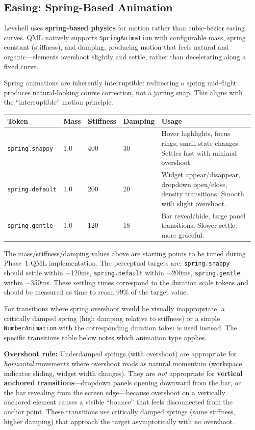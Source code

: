\documentclass[11pt,a4paper]{article}
\begin{document}
\subsection{Easing: Spring-Based Animation}

Levshell uses \textbf{spring-based physics} for motion rather than cubic-bezier easing curves. QML natively supports \texttt{SpringAnimation} with configurable mass, spring constant (stiffness), and damping, producing motion that feels natural and organic---elements overshoot slightly and settle, rather than decelerating along a fixed curve.

Spring animations are inherently interruptible: redirecting a spring mid-flight produces natural-looking course correction, not a jarring snap. This aligns with the ``interruptible'' motion principle.

\begin{longtable}{p{3.5cm} p{2cm} p{2cm} p{2cm} p{3cm}}
\toprule
\textbf{Token} & \textbf{Mass} & \textbf{Stiffness} & \textbf{Damping} & \textbf{Usage} \\
\midrule
\texttt{spring.snappy} & 1.0 & 400 & 30 & Hover highlights, focus rings, small state changes. Settles fast with minimal overshoot. \\
\addlinespace
\texttt{spring.default} & 1.0 & 200 & 20 & Widget appear/disappear, dropdown open/close, density transitions. Smooth with slight overshoot. \\
\addlinespace
\texttt{spring.gentle} & 1.0 & 120 & 18 & Bar reveal/hide, large panel transitions. Slower settle, more graceful. \\
\bottomrule
\end{longtable}

\begin{notebox}
The mass/stiffness/damping values above are starting points to be tuned during Phase~1 QML implementation. The perceptual targets are: \texttt{spring.snappy} should settle within $\sim$120ms, \texttt{spring.default} within $\sim$200ms, \texttt{spring.gentle} within $\sim$350ms. These settling times correspond to the duration scale tokens and should be measured as time to reach 99\% of the target value.

For transitions where spring overshoot would be visually inappropriate, a critically damped spring (high damping relative to stiffness) or a simple \texttt{NumberAnimation} with the corresponding duration token is used instead. The specific transitions table below notes which animation type applies.

\textbf{Overshoot rule:} Underdamped springs (with overshoot) are appropriate for \emph{horizontal} movements where overshoot reads as natural momentum (workspace indicator sliding, widget width changes). They are \emph{not} appropriate for \textbf{vertical anchored transitions}---dropdown panels opening downward from the bar, or the bar revealing from the screen edge---because overshoot on a vertically anchored element causes a visible ``bounce'' that feels disconnected from the anchor point. These transitions use critically damped springs (same stiffness, higher damping) that approach the target asymptotically with no overshoot.
\end{notebox}
\end{document}
